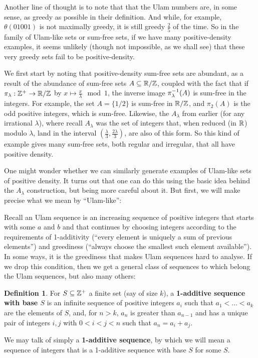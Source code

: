 \documentclass{article}
\theoremstyle{definition}
\newtheorem{definition}{Definition}
\theoremstyle{remark}
\numberwithin{equation}{section}
\begin{document}
Another line of thought is to note that that the Ulam numbers are, in
some sense, as greedy as possible in their definition.  And while, for
example, $\theta(01001)$ is not maximally greedy, it is still greedy
$\frac25$ of the time.  So in the family of Ulam-like sets or sum-free
sets, if we have many positive-density examples, it seems unlikely
(though not impossible, as we shall see) that these very greedy sets
fail to be positive-density.  

We first start by noting that positive-density sum-free sets are
abundant, as a result of the abundance of sum-free sets
$A \subseteq \mathbb{R}/\mathbb{Z}$, coupled with the fact that if
$\pi_\lambda : \mathbb{Z}^+ \to \mathbb{R}/\mathbb{Z}$ by
$x \mapsto \frac{x}{\lambda} \mod{1}$, the inverse image
$\pi_\lambda^{-1}(A)$ is sum-free in the integers.  For example, the
set $A = \{1/2\}$ is sum-free in $\mathbb{R}/\mathbb{Z}$, and $\pi_2(A)$ is the odd
positive integers, which is sum-free.  Likewise, the $A_\lambda$ from
earlier (for any irrational $\lambda$), where recall $A_\lambda$ was
the set of integers that, when reduced (in $\mathbb{R}$) modulo $\lambda$,
land in the interval $(\frac{\lambda}{3}, \frac{2\lambda}{3})$, are
also of this form.  So this kind of example gives many sum-free sets,
both regular and irregular, that all have positive density.

One might wonder whether we can similarly generate examples of
Ulam-like sets of positive density.  It turns out that one can do this
using the basic idea behind the $A_\lambda$ construction, but being
more careful about it.  But first, we will make precise what we mean
by ``Ulam-like'': 

Recall an Ulam sequence is an increasing sequence of positive integers
that starts with some $a$ and $b$ and that continues by choosing
integers according to the requirements of 1-additivity (``every
element is uniquely a sum of previous elements'') and greediness
(``always choose the smallest such element available'').  In some
ways, it is the greediness that makes Ulam sequences hard to analyse.
If we drop this condition, then we get a general class of sequences to
which belong the Ulam sequences, but also many others:

\begin{definition}\label{def:1additive}
  For $S \subseteq \mathbb{Z}^+$ a finite set (say of size $k$), a
  \textbf{1-additive sequence with base $S$} is an infinite sequence
  of positive integers $a_i$ such that $a_1 < \ldots < a_k$ are the
  elements of $S$, and, for $n > k$, $a_n$ is greater than $a_{n-1}$
  and has a unique pair of integers $i, j$ with $0 < i < j < n$ such
  that $a_n = a_i + a_j$.

  We may talk of simply a \textbf{1-additive sequence}, by which we
  will mean a sequence of integers that is a 1-additive sequence with
  base $S$ for some $S$.
\end{definition}
\end{document}
